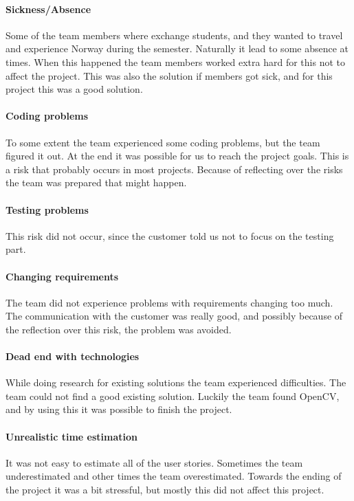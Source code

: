 \paragraph{Sickness/Absence}
Some of the team members where exchange students, and they wanted to travel and experience Norway during the semester. Naturally it lead to some absence at times. When this happened the team members worked extra hard for this not to affect the project. This was also the solution if members got sick, and for this project this was a good solution. 

\paragraph{Coding problems}
To some extent the team experienced some coding problems, but the team figured it out. At the end it was possible for us to reach the project goals. This is a risk that probably occurs in most projects. Because of reflecting over the risks the team was prepared that might happen.

\paragraph{Testing problems}
This risk did not occur, since the customer told us not to focus on the testing part.

\paragraph{Changing requirements} 
The team did not experience problems with requirements changing too much. The communication with the customer was really good, and possibly because of the reflection over this risk, the problem was avoided.

\paragraph{Dead end with technologies}
While doing research for existing solutions the team experienced difficulties. The team could not find a good existing solution. Luckily the team found OpenCV, and by using this it was possible to finish the project. 

\paragraph{Unrealistic time estimation}
It was not easy to estimate all of the user stories. Sometimes the team underestimated and other times the team overestimated. Towards the ending of the project it was a bit stressful, but mostly this did not affect this project.

